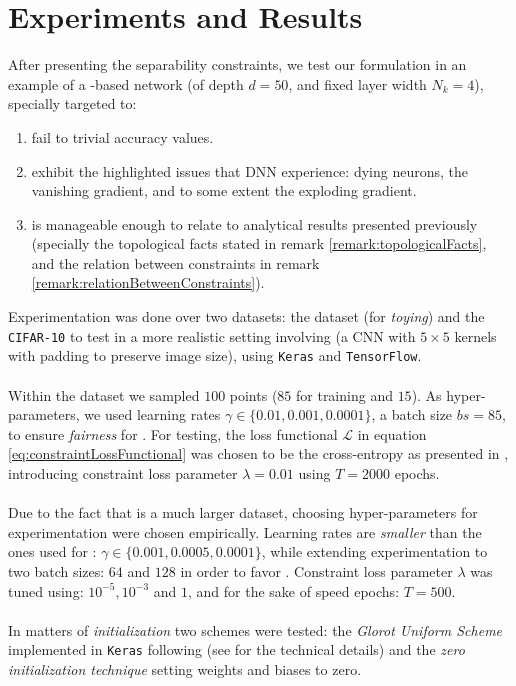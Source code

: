 \section{Experiments and Results}\label{sec:experiments}
After presenting the separability constraints, we test our formulation in an example of a \ReLU-based network (of depth $d=50$, and fixed layer width $N_k=4$), specially targeted to: 
\begin{enumerate}
    \item fail to trivial accuracy values.
    \item exhibit the highlighted issues that DNN experience: dying neurons, the vanishing gradient, and to some extent the exploding gradient.
    \item is manageable enough to relate to analytical results presented previously (specially the topological facts stated in remark \ref{remark:topologicalFacts}, and the relation between constraints in remark \ref{remark:relationBetweenConstraints}).
\end{enumerate}
Experimentation was done over two datasets: the \moons dataset (for \emph{toying}) and the \texttt{CIFAR-10} to test in a more realistic setting involving (a CNN with $5\times 5$ kernels with padding to preserve image size), using \texttt{Keras} and \texttt{TensorFlow}.
\\\\
Within the \moons dataset we sampled $100$ points ($85$ for training and $15$). As hyper-parameters, we used learning rates $\gamma \in \{0.01, 0.001, 0.0001\}$, a batch size $bs = 85$, to ensure \emph{fairness} for \ReLUU.  For testing, the loss functional $\mathcal{L}$ in equation \ref{eq:constraintLossFunctional}  was chosen to be the cross-entropy as presented in \cite{LeCun06atutorial}, introducing constraint loss parameter $\lambda = 0.01$ using $T = 2000$ epochs. 
\\\\
Due to the fact that \cifar is a much larger dataset, choosing hyper-parameters for experimentation were chosen empirically. Learning rates are \emph{smaller} than the ones used for \moons: $\gamma \in \{0.001, 0.0005, 0.0001 \}$, while extending experimentation to two batch sizes: $64$ and $128$ in order to favor \ReLUP.  Constraint loss parameter $\lambda$ was tuned using: $10^{-5},10^{-3}$ and $1$, and for the sake of speed epochs: $T = 500$.
\\\\
In matters of \emph{initialization} two schemes were tested: the \emph{Glorot Uniform Scheme} implemented in \texttt{Keras} following (see \cite{Glorot10Initialization} for the technical details) and the \emph{zero initialization technique} setting weights and biases to zero. 

